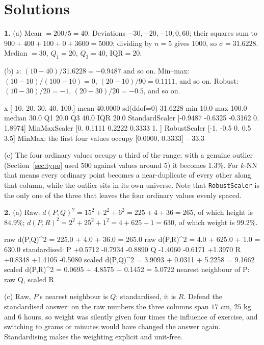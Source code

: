 \documentclass[11pt]{article}
\begin{document}
\section{Solutions}
\label{sec:solutions}

\textbf{1.} (a) Mean $= 200/5 = 40$. Deviations $-30, -20, -10, 0, 60$; their
squares sum to $900+400+100+0+3600 = 5000$; dividing by $n = 5$ gives $1000$,
so $\sigma = 31.6228$. Median $= 30$, $Q_1 = 20$, $Q_3 = 40$,
$\mathrm{IQR} = 20$.

(b) $z$: $(10-40)/31.6228 = -0.9487$ and so on. Min--max:
$(10-10)/(100-10) = 0$, $(20-10)/90 = 0.1111$, and so on. Robust:
$(10-30)/20 = -1$, $(20-30)/20 = -0.5$, and so on.

\begin{codeout}
x             [ 10.  20.  30.  40. 100.]
mean 40.0000  sd(ddof=0) 31.6228
min 10.0  max 100.0  median 30.0  Q1 20.0  Q3 40.0  IQR 20.0
StandardScaler [-0.9487 -0.6325 -0.3162  0.      1.8974]
MinMaxScaler   [0.     0.1111 0.2222 0.3333 1.    ]
RobustScaler   [-1.  -0.5  0.   0.5  3.5]
MinMax: the first four values occupy [0.0000, 0.3333] -- 33.3%
\end{codeout}

(c) The four ordinary values occupy a third of the range; with a genuine
outlier (Section~\ref{sec:typo} used $500$ against values around $5$) it becomes
$1.3\%$. For $k$-NN that means every ordinary point becomes a near-duplicate of
every other along that column, while the outlier sits in its own universe. Note
that \texttt{RobustScaler} is the only one of the three that leaves the four
ordinary values evenly spaced.

\medskip
\textbf{2.} (a) Raw:
$d(P,Q)^2 = 15^2 + 2^2 + 6^2 = 225 + 4 + 36 = 265$, of which height is
$84.9\%$; $d(P,R)^2 = 2^2 + 25^2 + 1^2 = 4 + 625 + 1 = 630$, of which weight
is $99.2\%$.

\begin{codeout}
   raw    d(P,Q)^2 = 225.0 + 4.0 + 36.0 = 265.0
   raw    d(P,R)^2 = 4.0 + 625.0 + 1.0 = 630.0
   standardised:
      P  +0.5712 -0.7934 -0.8890
      Q  -1.4060 -0.6171 +1.3970
      R  +0.8348 +1.4105 -0.5080
   scaled d(P,Q)^2 = 3.9093 + 0.0311 + 5.2258 = 9.1662
   scaled d(P,R)^2 = 0.0695 + 4.8575 + 0.1452 = 5.0722
   nearest neighbour of P: raw Q, scaled R
\end{codeout}

(c) Raw, $P$'s nearest neighbour is $Q$; standardised, it is $R$. Defend the
standardised answer: on the raw numbers the three columns span $17$ cm, $25$ kg
and $6$ hours, so weight was silently given four times the influence of
exercise, and switching to grams or minutes would have changed the answer
again. Standardising makes the weighting explicit and unit-free.
\end{document}
